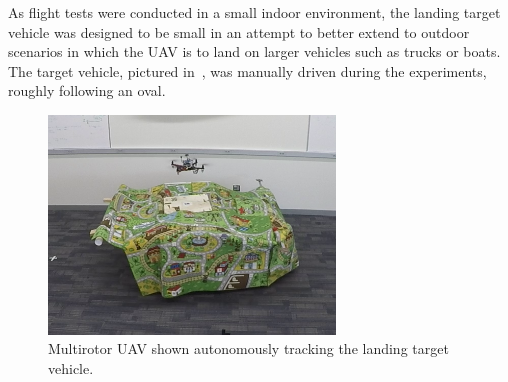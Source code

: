 
As flight tests were conducted in a small indoor environment,
the landing target
vehicle was designed to be small in an attempt to better extend to outdoor
scenarios in which the UAV is to land on larger vehicles such as trucks or boats.
The target vehicle, pictured in~, was manually
driven during the experiments,
roughly following an oval.

\begin{figure}
  \centering
  \includegraphics[width=3.0in]{imgs/landing_vehicle.png}
  \caption[UAV Tracking the Target Vehicle During Flight Experiment]{Multirotor
    UAV shown autonomously tracking the landing target
  vehicle.}
  \label{fig:landing_vehicle}
\end{figure}
